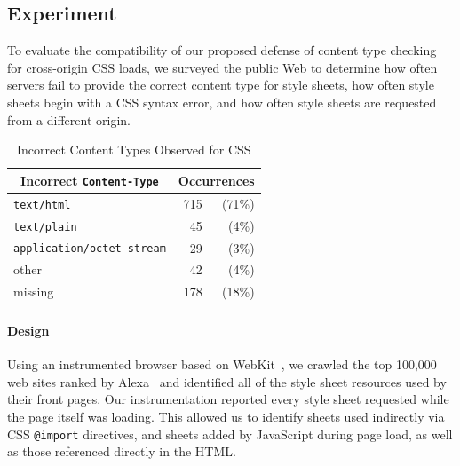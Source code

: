 \documentclass{sig-alternate}
\begin{document}
\subsection{Experiment}
To evaluate the compatibility of our proposed defense of content
type checking for cross-origin CSS loads, we surveyed the public
Web to determine how often servers fail to provide the correct
content type for style sheets, how often style sheets begin with
a CSS syntax error, and how often style sheets are requested
from a different origin.

\begin{table}[b]
\centering
\begin{tabular}{lrr}
\toprule
\multicolumn{1}{c}{Incorrect \texttt{Content-Type}}&
\multicolumn{2}{c}{Occurrences}\\
\midrule
               \texttt{text/html}& 715& (71\%)\\
              \texttt{text/plain}&  45&  (4\%)\\
\texttt{application/octet-stream}&  29&  (3\%)\\
                            other&  42&  (4\%)\\
                           missing& 178& (18\%)\\
\bottomrule
\end{tabular}
\caption{Incorrect Content Types Observed for CSS}
\label{table:MIME}
\end{table}

\paragraph{Design}
Using an instrumented browser based on WebKit~\cite{webkit}, we
crawled the top 100,000 web sites ranked by Alexa~\cite{alexa} and
identified all of the style sheet resources used by their front pages.
Our instrumentation reported every style sheet requested while the
page itself was loading.  This allowed us to identify sheets used
indirectly via CSS \verb|@import| directives, and sheets added by
JavaScript during page load, as well as those referenced directly in
the HTML.
\end{document}
